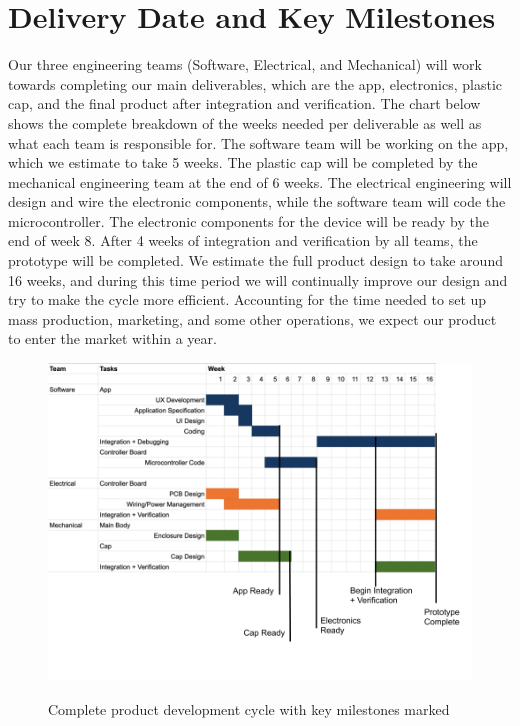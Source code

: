 \documentclass[12pt]{article}
\begin{document}
	\section*{Delivery Date and Key Milestones}
Our three engineering teams (Software, Electrical, and Mechanical) will work towards completing our main deliverables, which are the app, electronics, plastic cap, and the final product after integration and verification. The chart below shows the complete breakdown of the weeks needed per deliverable as well as what each team is responsible for. The software team will be working on the app, which we estimate to take 5 weeks. The plastic cap will be completed by the mechanical engineering team at the end of 6 weeks. The electrical engineering will design and wire the electronic components, while the software team will code the microcontroller. The electronic components for the device will be ready by the end of week 8. After 4 weeks of integration and verification by all teams, the prototype will be completed. We estimate the full product design to take around 16 weeks, and during this time period we will continually improve our design and try to make the cycle more efficient. Accounting for the time needed to set up mass production, marketing, and some other operations, we expect our product to enter the market within a year. 
\begin{figure}[H]
	\includegraphics[width=\textwidth]{milestones.png}
	\label{fig:milestones}
	\caption{Complete product development cycle with key milestones marked}
\end{figure}
\end{document}
